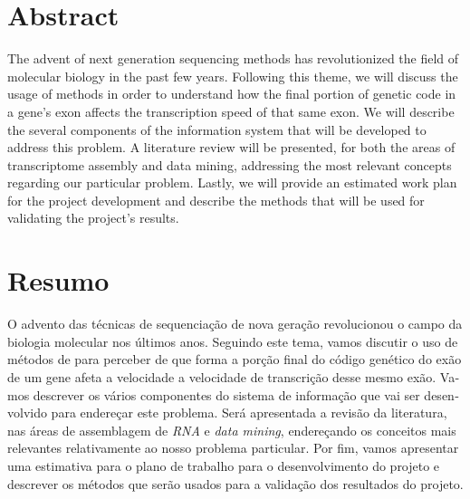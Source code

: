 \chapter*{Abstract}

The advent of next generation sequencing methods has revolutionized the field of
molecular biology in the past few years. Following this theme, we will discuss
the usage of \rnaseq{} methods in order to understand how the final portion of
genetic code in a gene's exon affects the transcription speed of that same exon.
We will describe the several components of the information system that will be
developed to address this problem. A literature review will be presented, for
both the areas of transcriptome assembly and data mining, addressing the most
relevant concepts regarding our particular problem. Lastly, we will provide an
estimated work plan for the project development and describe the methods that
will be used for validating the project's results.

\chapter*{Resumo}

\begin{otherlanguage}{portuguese}
O advento das técnicas de sequenciação de nova geração revolucionou o campo da
biologia molecular nos últimos anos. Seguindo este tema, vamos discutir o uso de
métodos de \textit{\rnaseq{}} para perceber de que forma a porção final do
código genético do exão de um gene afeta a velocidade a velocidade de
transcrição desse mesmo exão. Vamos descrever os vários componentes do sistema
de informação que vai ser desenvolvido para endereçar este problema. Será
apresentada a revisão da literatura, nas áreas de assemblagem de \textit{RNA} e
\textit{data mining}, endereçando os conceitos mais relevantes relativamente ao
nosso problema particular. Por fim, vamos apresentar uma estimativa para o plano
de trabalho para o desenvolvimento do projeto e descrever os métodos que serão
usados para a validação dos resultados do projeto.
\end{otherlanguage}
